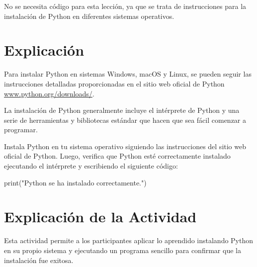 \documentclass[
  a4paper,
  onepage,
  openany]{scrreprt}
\newenvironment{Shaded}{\begin{snugshade}}{\end{snugshade}}
\newcommand{\BuiltInTok}[1]{\textcolor[rgb]{0.00,0.23,0.31}{#1}}
\newcommand{\NormalTok}[1]{\textcolor[rgb]{0.00,0.23,0.31}{#1}}
\newcommand{\StringTok}[1]{\textcolor[rgb]{0.13,0.47,0.30}{#1}}
\begin{document}
No se necesita código para esta lección, ya que se trata de
instrucciones para la instalación de Python en diferentes sistemas
operativos.

\hypertarget{explicaciuxf3n-2}{%
\section{Explicación}\label{explicaciuxf3n-2}}

Para instalar Python en sistemas Windows, macOS y Linux, se pueden
seguir las instrucciones detalladas proporcionadas en el sitio web
oficial de Python
\href{https://www.python.org/downloads/}{www.python.org/downloads/}.

La instalación de Python generalmente incluye el intérprete de Python y
una serie de herramientas y bibliotecas estándar que hacen que sea fácil
comenzar a programar.

\begin{tcolorbox}[enhanced jigsaw, breakable, opacityback=0, toptitle=1mm, coltitle=black, toprule=.15mm, rightrule=.15mm, colframe=quarto-callout-important-color-frame, opacitybacktitle=0.6, arc=.35mm, title=\textcolor{quarto-callout-important-color}{\faExclamation}\hspace{0.5em}{Actividad Práctica}, titlerule=0mm, colbacktitle=quarto-callout-important-color!10!white, bottomtitle=1mm, bottomrule=.15mm, colback=white, left=2mm, leftrule=.75mm]

Instala Python en tu sistema operativo siguiendo las instrucciones del
sitio web oficial de Python. Luego, verifica que Python esté
correctamente instalado ejecutando el intérprete y escribiendo el
siguiente código:

\begin{Shaded}
\begin{Highlighting}[]
\BuiltInTok{print}\NormalTok{(}\StringTok{"Python se ha instalado correctamente."}\NormalTok{)}
\end{Highlighting}
\end{Shaded}

\end{tcolorbox}

\hypertarget{explicaciuxf3n-de-la-actividad-2}{%
\section{Explicación de la
Actividad}\label{explicaciuxf3n-de-la-actividad-2}}

Esta actividad permite a los participantes aplicar lo aprendido
instalando Python en su propio sistema y ejecutando un programa sencillo
para confirmar que la instalación fue exitosa.
\end{document}
